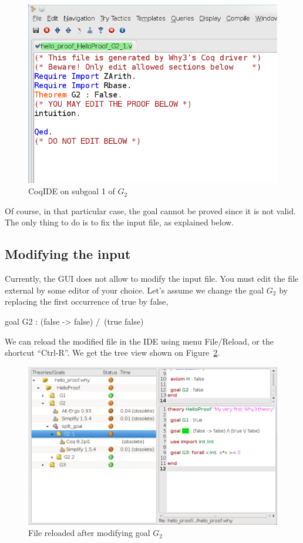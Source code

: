 \begin{figure}[tbp]
  \includegraphics[width=\textwidth]{coqide-0-70.png}
  \caption{CoqIDE on subgoal 1 of $G_2$}
  \label{fig:coqide}
\end{figure}

Of course, in that particular case, the goal cannot be proved since it
is not valid. The only thing to do is to fix the input file, as
explained below.

\subsection{Modifying the input}

Currently, the GUI does not allow to modify the input file. You must
edit the file external by some editor of your choice. Let's assume we
change the goal $G_2$ by replacing the first occurrence of true by
false, \eg
\begin{whycode}
  goal G2 : (false -> false) /\ (true \/ false)
\end{whycode}
We can reload the modified file in the IDE using menu \textsf{File/Reload}, or the shortcut ``Ctrl-R''. We get the tree view shown on Figure~\ref{fig:gui5}.

\begin{figure}[tbp]
  \includegraphics[width=\textwidth]{gui-0-70-5.png}
  \caption{File reloaded after modifying goal $G_2$}
  \label{fig:gui5}
\end{figure}

